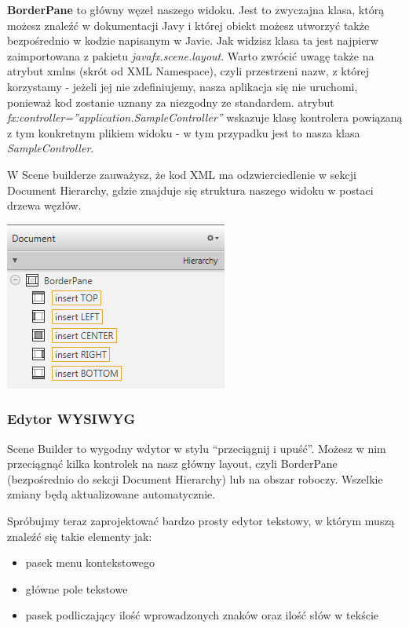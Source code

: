 \documentclass[letterpaper,10pt,english]{sphinxmanual}
\begin{document}
\textbf{BorderPane} to główny węzeł naszego widoku. Jest to zwyczajna klasa, którą możesz znaleźć w dokumentacji Javy i której obiekt możesz utworzyć także bezpośrednio w kodzie napisanym w Javie. Jak widzisz klasa ta jest najpierw zaimportowana z pakietu \emph{javafx.scene.layout}. Warto zwrócić uwagę także na atrybut xmlns (skrót od XML Namespace), czyli przestrzeni nazw, z której korzystamy - jeżeli jej nie zdefiniujemy, nasza aplikacja się nie uruchomi, ponieważ kod zostanie uznany za niezgodny ze standardem. atrybut \emph{fx:controller=''application.SampleController''} wskazuje klasę kontrolera powiązaną z tym konkretnym plikiem widoku - w tym przypadku jest to nasza klasa \emph{SampleController}.

W Scene builderze zauważysz, że kod XML ma odzwierciedlenie w sekcji Document Hierarchy, gdzie znajduje się struktura naszego widoku w postaci drzewa węzłów.

{\hfill\includegraphics{dochier.png}\hfill}


\subsubsection{Edytor WYSIWYG}
\label{gui:edytor-wysiwyg}
Scene Builder to wygodny wdytor w stylu ``przeciągnij i upuść''. Możesz w nim przeciągnąć kilka kontrolek na nasz główny layout, czyli BorderPane (bezpośrednio do sekcji Document Hierarchy) lub na obszar roboczy. Wszelkie zmiany będą aktualizowane automatycznie.

Spróbujmy teraz zaprojektować bardzo prosty edytor tekstowy, w którym muszą znaleźć się takie elementy jak:
\begin{itemize}
\item {} 
pasek menu kontekstowego

\item {} 
główne pole tekstowe

\item {} 
pasek podliczający ilość wprowadzonych znaków oraz ilość słów w tekście

\end{itemize}
\end{document}
